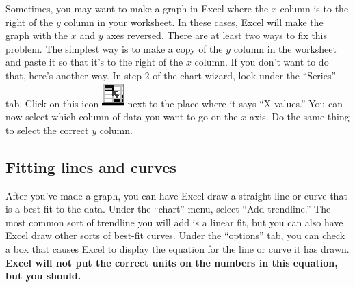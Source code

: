 Sometimes, you may want to make a graph in Excel where the $x$ column
is to the right of the $y$ column in your worksheet.  In these cases,
Excel will make the graph with the $x$ and $y$ axes reversed.  There
are at least two ways to fix this problem.  The simplest way is to make
a copy of the $y$ column in the worksheet and paste it so that it's
to the right of the $x$ column.  If you don't want to do that, here's
another way.  In step 2 of the chart wizard, look under the ``Series''
tab.  Click on this icon \includegraphics{excelicon.eps} next to the
place where it says ``X values.''  You can now select which column of data you
want to go on the $x$ axis. Do the same thing to select the correct
$y$ column.

\subsection{Fitting lines and curves}

After you've made a graph, you can have Excel draw a straight line or
curve that is a best fit to the data.  Under the ``chart'' menu,
select ``Add trendline.''  The most common sort of trendline you
will add is a linear fit, but you can also have Excel draw other
sorts of best-fit
curves.  Under the ``options'' tab, you can check a box that causes
Excel to display the equation for the line or curve it has drawn.
{\bf Excel will not put the correct units on the numbers in this equation,
but you should.}
